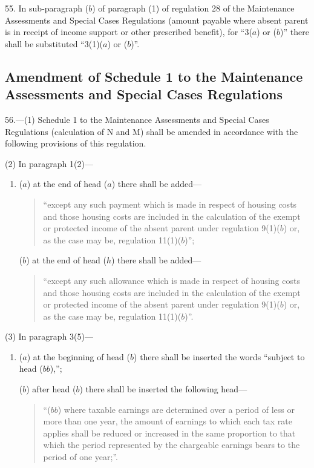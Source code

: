 \documentclass[12pt,a4paper]{article}
\begin{document}
55.  In sub-paragraph ($b$) of paragraph (1) of regulation 28 of the Maintenance Assessments and Special Cases Regulations (amount payable where absent parent is in receipt of income support or other prescribed benefit), for “3($a$) or ($b$)” there shall be substituted “3(1)($a$) or ($b$)”.

\subsection[56. Amendment of Schedule 1 to the Maintenance Assessments and Special Cases Regulations]{Amendment of Schedule 1 to the Maintenance Assessments and Special Cases Regulations}

56.—(1) Schedule 1 to the Maintenance Assessments and Special Cases Regulations (calculation of N and M) shall be amended in accordance with the following provisions of this regulation.

(2) In paragraph 1(2)—
\begin{enumerate}\item[]
($a$) at the end of head ($a$) there shall be added—
\begin{quotation}
“except any such payment which is made in respect of housing costs and those housing costs are included in the calculation of the exempt or protected income of the absent parent under regulation 9(1)($b$) or, as the case may be, regulation 11(1)($b$)”;
\end{quotation}

($b$) at the end of head ($h$) there shall be added—
\begin{quotation}
“except any such allowance which is made in respect of housing costs and those housing costs are included in the calculation of the exempt or protected income of the absent parent under regulation 9(1)($b$) or, as the case may be, regulation 11(1)($b$)”.
\end{quotation}
\end{enumerate}

(3) In paragraph 3(5)—
\begin{enumerate}\item[]
($a$) at the beginning of head ($b$) there shall be inserted the words “subject to head ($bb$),”;

($b$) after head ($b$) there shall be inserted the following head—
\begin{quotation}
“($bb$) where taxable earnings are determined over a period of less or more than one year, the amount of earnings to which each tax rate applies shall be reduced or increased in the same proportion to that which the period represented by the chargeable earnings bears to the period of one year;”.
\end{quotation}
\end{enumerate}
\end{document}
